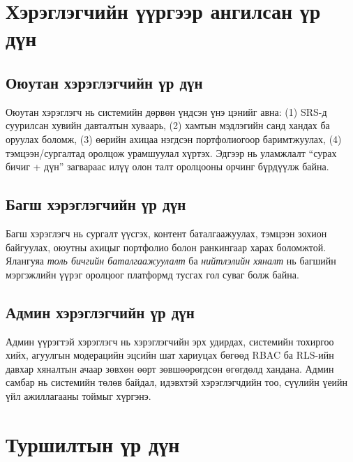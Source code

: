 

\section{Хэрэглэгчийн үүргээр ангилсан үр дүн}

\subsection{Оюутан хэрэглэгчийн үр дүн}

Оюутан хэрэглэгч нь системийн дөрвөн үндсэн үнэ цэнийг авна: (1) SRS-д суурилсан хувийн давталтын хуваарь, (2) хамтын мэдлэгийн санд хандах ба оруулах боломж, (3) өөрийн ахицаа нэгдсэн портфолиогоор баримтжуулах, (4) тэмцээн/сургалтад оролцож урамшуулал хүртэх. Эдгээр нь уламжлалт ``сурах бичиг + дүн'' загвараас илүү олон талт оролцооны орчинг бүрдүүлж байна.

\subsection{Багш хэрэглэгчийн үр дүн}

Багш хэрэглэгч нь сургалт үүсгэх, контент баталгаажуулах, тэмцээн зохион байгуулах, оюутны ахицыг портфолио болон ранкингаар харах боломжтой. Ялангуяа \textit{толь бичгийн баталгаажуулалт} ба \textit{нийтлэлийн хяналт} нь багшийн мэргэжлийн үүрэг оролцоог платформд тусгах гол суваг болж байна.

\subsection{Админ хэрэглэгчийн үр дүн}

Админ үүрэгтэй хэрэглэгч нь хэрэглэгчийн эрх удирдах, системийн тохиргоо хийх, агуулгын модерацийн эцсийн шат хариуцах бөгөөд RBAC ба RLS-ийн давхар хяналтын ачаар зөвхөн өөрт зөвшөөрөгдсөн өгөгдөлд хандана. Админ самбар нь системийн төлөв байдал, идэвхтэй хэрэглэгчдийн тоо, сүүлийн үеийн үйл ажиллагааны тоймыг хүргэнэ.


\section{Туршилтын үр дүн}

